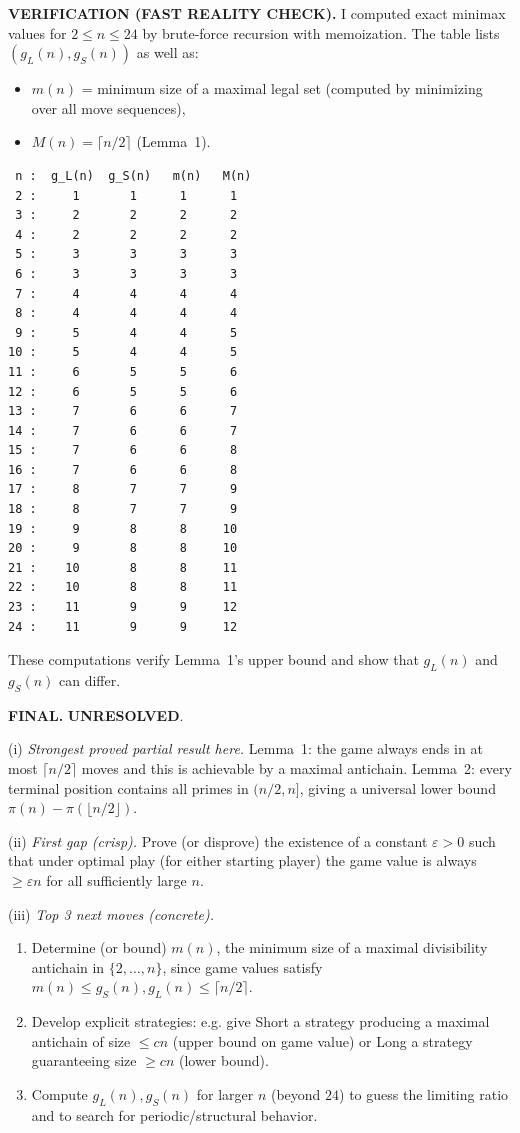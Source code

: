 \medskip
\noindent\textbf{VERIFICATION (FAST REALITY CHECK).}
I computed exact minimax values for $2\le n\le 24$ by brute-force recursion with memoization.
The table lists $(g_L(n),g_S(n))$ as well as:
\begin{itemize}
\item $m(n)$ = minimum size of a maximal legal set (computed by minimizing over all move sequences),
\item $M(n)=\lceil n/2\rceil$ (Lemma~1).
\end{itemize}
\begin{verbatim}
 n :  g_L(n)  g_S(n)   m(n)   M(n)
 2 :     1       1      1      1
 3 :     2       2      2      2
 4 :     2       2      2      2
 5 :     3       3      3      3
 6 :     3       3      3      3
 7 :     4       4      4      4
 8 :     4       4      4      4
 9 :     5       4      4      5
10 :     5       4      4      5
11 :     6       5      5      6
12 :     6       5      5      6
13 :     7       6      6      7
14 :     7       6      6      7
15 :     7       6      6      8
16 :     7       6      6      8
17 :     8       7      7      9
18 :     8       7      7      9
19 :     9       8      8     10
20 :     9       8      8     10
21 :    10       8      8     11
22 :    10       8      8     11
23 :    11       9      9     12
24 :    11       9      9     12
\end{verbatim}
These computations verify Lemma~1's upper bound and show that $g_L(n)$ and $g_S(n)$ can differ.

\medskip
\noindent\textbf{FINAL.} \textbf{UNRESOLVED}.

\noindent(i) \emph{Strongest proved partial result here.}
Lemma~1: the game always ends in at most $\lceil n/2\rceil$ moves and this is achievable by a maximal antichain.
Lemma~2: every terminal position contains all primes in $(n/2,n]$, giving a universal lower bound $\pi(n)-\pi(\lfloor n/2\rfloor)$.

\noindent(ii) \emph{First gap (crisp).}
Prove (or disprove) the existence of a constant $\varepsilon>0$ such that under optimal play (for either starting player) the game value is always $\ge \varepsilon n$ for all sufficiently large $n$.

\noindent(iii) \emph{Top 3 next moves (concrete).}
\begin{enumerate}
\item Determine (or bound) $m(n)$, the minimum size of a maximal divisibility antichain in $\{2,\dots,n\}$, since game values satisfy $m(n)\le g_S(n),g_L(n)\le \lceil n/2\rceil$.
\item Develop explicit strategies: e.g. give Short a strategy producing a maximal antichain of size $\le cn$ (upper bound on game value) or Long a strategy guaranteeing size $\ge cn$ (lower bound).
\item Compute $g_L(n),g_S(n)$ for larger $n$ (beyond $24$) to guess the limiting ratio and to search for periodic/structural behavior.
\end{enumerate}

